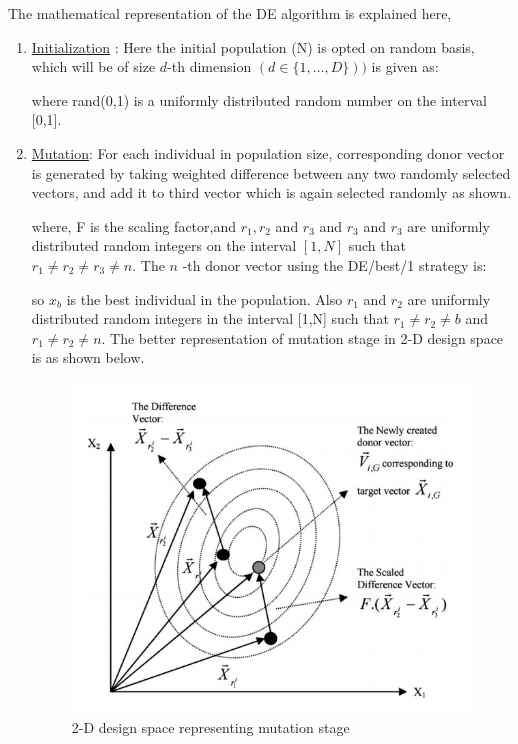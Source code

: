 The mathematical representation of the DE algorithm is explained here,
\begin{enumerate}
\item \underline{Initialization} : Here the initial population (N) is opted on random basis, which will be of size $d$-th dimension $(d\in\{1, \ldots, D\}))$ is given as: 

where rand(0,1) is a uniformly distributed random number on the interval [0,1].

\item \underline{Mutation}: For each individual in population size, corresponding donor vector is generated by taking weighted difference between any two randomly selected vectors, and add it to third vector which is again selected randomly as shown. 

where, F is the scaling factor,and  \(r_{1}, r_{2}\) and \(r_{3}\) and \(r_{3}\) and \(r_{3}\) are uniformly distributed random integers on the interval \([1, N]\) such that \(r_{1} \neq r_{2} \neq r_{3} \neq n .\) The \(n\) -th donor vector using the DE/best/1 strategy is:

so $x_b$ is the best individual in the population. Also $r_1$ and $r_2$ are uniformly distributed random integers in the interval [1,N] such that \(r_{1} \neq r_{2} \neq b\) and \(r_{1} \neq r_{2} \neq n\). The better representation of mutation stage in 2-D design space is as shown below.
\begin{figure}[!ht]
    \centering
    \includegraphics[scale = 0.5]{figures/mutation.png}
    \caption{2-D design space representing mutation stage\cite{storn}}
    \label{mutation}
\end{figure}


\end{enumerate}
